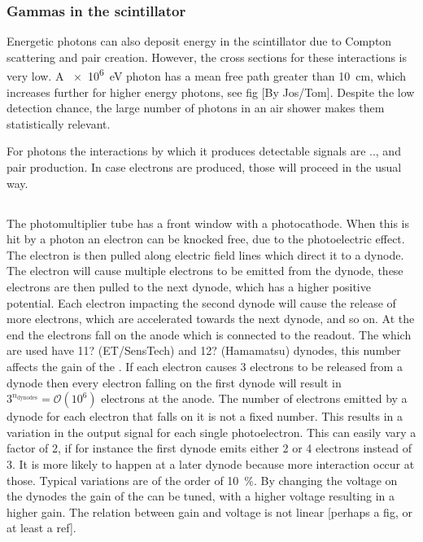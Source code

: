 \subsubsection{Gammas in the scintillator}

Energetic photons can also deposit energy in the scintillator due to Compton scattering and pair creation. However, the cross sections for these interactions is very low. A \SI{e6}{\eV} photon  has a mean free path greater than \SI{10}{\centi\meter}, which increases further for higher energy photons, see fig [By Jos/Tom]. Despite the low detection chance, the large number of photons in an air shower makes them statistically relevant.

For photons the interactions by which it produces detectable signals are .., and pair production. In case electrons are produced, those will proceed in the usual way.


\subsection{\pmt}

The photomultiplier tube has a front window with a photocathode. When this is hit by a photon an electron can be knocked free, due to the photoelectric effect. The electron is then pulled along electric field lines which direct it to a dynode. The electron will cause multiple electrons to be emitted from the dynode, these electrons are then pulled to the next dynode, which has a higher positive potential. Each electron impacting the second dynode will cause the release of more electrons, which are accelerated towards the next dynode, and so on. At the end the electrons fall on the anode which is connected to the readout. The \pmts which are used have 11? (ET/SensTech) and 12? (Hamamatsu) dynodes, this number affects the gain of the \pmt. If each electron causes \num{3} electrons to be released from a dynode then every electron falling on the first dynode will result in $3^{n_{\mathrm{dynodes}}} = \mathcal{O}(10^6)$ electrons at the anode. The number of electrons emitted by a dynode for each electron that falls on it is not a fixed number. This results in a variation in the output signal for each single photoelectron. This can easily vary a factor of 2, if for instance the first dynode emits either 2 or 4 electrons instead of 3. It is more likely to happen at a later dynode because more interaction occur at those. Typical variations are of the order of \SI{10}{\percent}. By changing the voltage on the dynodes the gain of the \pmt can be tuned, with a higher voltage resulting in a higher gain. The relation between gain and voltage is not linear [perhaps a fig, or at least a ref]. 

